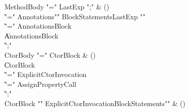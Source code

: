 \begin{bbgrammar}
 MethodBody  \label{prod:MethodBody}  \: \xcd"=" LastExp \xcd";" & ()\\
    \| \xcd"=" Annotations\opt \xcd"{" BlockStatements\opt LastExp \xcd"}"\\
    \| \xcd"=" Annotations\opt Block\\
    \| Annotations\opt Block\\
    \| \xcd";"\\
 CtorBody  \label{prod:CtorBody}  \: \xcd"=" CtorBlock & ()\\
    \| CtorBlock\\
    \| \xcd"=" ExplicitCtorInvocation\\
    \| \xcd"=" AssignPropertyCall\\
    \| \xcd";"\\
 CtorBlock  \label{prod:CtorBlock}  \: \xcd"{" ExplicitCtorInvocation\opt BlockStatements\opt \xcd"}" & ()\\
\end{bbgrammar}

